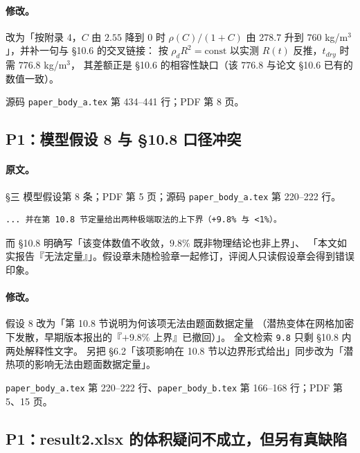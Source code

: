 \documentclass[11pt,a4paper]{ctexart}
\newcommand{\src}[1]{\texttt{#1}}
\newcommand{\loc}[1]{\textcolor{blue!60!black}{#1}}
\begin{document}
\paragraph{修改。}改为「按附录 4，$C$ 由 $2.55$ 降到 $0$ 时 $\rho(C)/(1+C)$ 由
$278.7$ 升到 $760$ kg/m$^3$」，并补一句与 §10.6 的交叉链接：
按 $\rho_dR^2=\text{const}$ 以实测 $R(t)$ 反推，$t_{dry}$ 时需 $776.8$ kg/m$^3$，
其差额正是 §10.6 的相容性缺口（该 $776.8$ 与论文 §10.6 已有的数值一致）。

\loc{源码 \src{paper\_body\_a.tex} 第 434--441 行；PDF 第 8 页}。

\subsection{P1：模型假设 8 与 §10.8 口径冲突}

\paragraph{原文。}\loc{§三 模型假设第 8 条；PDF 第 5 页；源码 \src{paper\_body\_a.tex} 第 220--222 行}。

\begin{lstlisting}[style=old]
... 并在第 10.8 节定量给出两种极端取法的上下界（+9.8% 与 <1%）。
\end{lstlisting}

\noindent 而 §10.8 明确写「该变体数值不收敛，$9.8\%$ 既非物理结论也非上界」、
「本文如实报告『无法定量』」。假设章未随检验章一起修订，评阅人只读假设章会得到错误印象。

\paragraph{修改。}假设 8 改为「第 10.8 节说明为何该项无法由题面数据定量
（潜热变体在网格加密下发散，早期版本报出的『$+9.8\%$ 上界』已撤回）」。
全文检索 \src{9.8} 只剩 §10.8 内两处解释性文字。
另把 §6.2「该项影响在 10.8 节以边界形式给出」同步改为「潜热项的影响无法由题面数据定量」。

\loc{\src{paper\_body\_a.tex} 第 220--222 行、\src{paper\_body\_b.tex} 第 166--168 行；PDF 第 5、15 页}。

\subsection{P1：result2.xlsx 的体积疑问不成立，但另有真缺陷}
\end{document}
